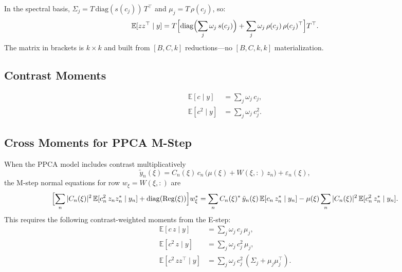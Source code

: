 \documentclass[11pt]{article}
\newcommand{\E}{\mathbb{E}}
\newcommand{\diag}{\mathrm{diag}}
\begin{document}
In the spectral basis, $\Sigma_j = T\,\diag(s(c_j))\,T^\top$ and
$\mu_j = T\,\rho(c_j)$, so:
\begin{equation}
  \E[zz^\top \mid y]
  = T \Bigl[\diag\Bigl(\sum_j \omega_j\, s(c_j)\Bigr)
    + \sum_j \omega_j\, \rho(c_j)\,\rho(c_j)^\top \Bigr] T^\top.
\end{equation}
The matrix in brackets is $k \times k$ and built from
$[B, C, k]$ reductions---no $[B, C, k, k]$ materialization.

\subsection{Contrast Moments}
\begin{align}
  \E[c \mid y] &= \sum_j \omega_j\, c_j, \\
  \E[c^2 \mid y] &= \sum_j \omega_j\, c_j^2.
\end{align}

\subsection{Cross Moments for PPCA M-Step}
\label{sec:cross-moments}

When the PPCA model includes contrast multiplicatively
\begin{equation}
  \tilde{y}_n(\xi) = C_n(\xi)\, c_n\, \bigl(\mu(\xi) + W(\xi,:)\, z_n\bigr)
  + \varepsilon_n(\xi),
\end{equation}
the M-step normal equations for row $w_\xi = W(\xi,:)$ are
\begin{equation}
  \Bigl[\sum_n |C_n(\xi)|^2\, \E[c_n^2\, z_n z_n^* \mid y_n]
  + \diag(\text{Reg}(\xi))\Bigr] w_\xi^*
  = \sum_n C_n(\xi)^*\, \tilde{y}_n(\xi)\, \E[c_n\, z_n^* \mid y_n]
  - \mu(\xi) \sum_n |C_n(\xi)|^2\, \E[c_n^2\, z_n^* \mid y_n].
\end{equation}
This requires the following contrast-weighted moments from the E-step:
\begin{align}
  \E[c\, z \mid y] &= \sum_j \omega_j\, c_j\, \mu_j,
  \label{eq:Ecz} \\
  \E[c^2\, z \mid y] &= \sum_j \omega_j\, c_j^2\, \mu_j,
  \label{eq:Ec2z} \\
  \E[c^2\, z z^\top \mid y]
  &= \sum_j \omega_j\, c_j^2\, (\Sigma_j + \mu_j \mu_j^\top).
  \label{eq:Ec2zz}
\end{align}
\end{document}
